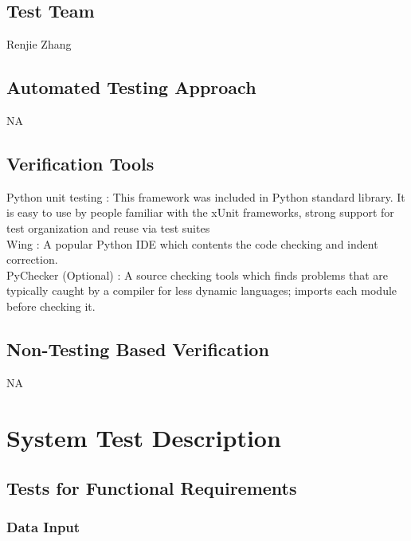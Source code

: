 \documentclass[12pt, titlepage]{article}
\begin{document}
\subsection{Test Team}

Renjie Zhang

\subsection{Automated Testing Approach}
NA
\subsection{Verification Tools}
Python unit testing : This framework was included in Python standard library. It is easy to use by people familiar with the xUnit frameworks, strong support for test organization and reuse via test suites\\
Wing : A popular Python IDE which contents the code checking and indent correction.\\
PyChecker (Optional) : A source checking tools which finds problems that are typically caught by a compiler for less dynamic languages; imports each module before checking it.\\



\subsection{Non-Testing Based Verification}
NA

\section{System Test Description}
\subsection{Tests for Functional Requirements}

\subsubsection{Data Input}
\end{document}
